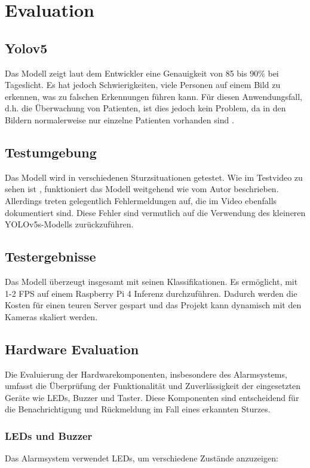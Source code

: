 \section{Evaluation}

\subsection{Yolov5}
Das Modell zeigt laut dem Entwickler eine Genauigkeit von 85 bis 90\% bei Tageslicht. Es hat jedoch Schwierigkeiten, viele Personen auf einem Bild zu erkennen, was zu falschen Erkennungen führen kann. Für diesen Anwendungsfall, d.h. die Überwachung von Patienten, ist dies jedoch kein Problem, da in den Bildern normalerweise nur einzelne Patienten vorhanden sind \cite{kumar_uttej2001image-based-human-fall-detection_2024}. 

\subsection{Testumgebung}
Das Modell wird in verschiedenen Sturzsituationen getestet. Wie im Testvideo zu sehen ist \cite{yolovideo}, funktioniert das Modell weitgehend wie vom Autor beschrieben. Allerdings treten gelegentlich Fehlermeldungen auf, die im Video ebenfalls dokumentiert sind. Diese Fehler sind vermutlich auf die Verwendung des kleineren YOLOv5s-Modells zurückzuführen.

\subsection{Testergebnisse}
Das Modell überzeugt insgesamt mit seinen Klassifikationen. Es ermöglicht, mit 1-2 FPS auf einem Raspberry Pi 4 Inferenz durchzuführen. Dadurch werden die Kosten für einen teuren Server gespart und das Projekt kann dynamisch mit den Kameras skaliert werden.

\subsection{Hardware Evaluation}

Die Evaluierung der Hardwarekomponenten, insbesondere des Alarmsystems, umfasst die Überprüfung der Funktionalität und Zuverlässigkeit der eingesetzten Geräte wie LEDs, Buzzer und Taster. Diese Komponenten sind entscheidend für die Benachrichtigung und Rückmeldung im Fall eines erkannten Sturzes.

\subsubsection{LEDs und Buzzer}
Das Alarmsystem verwendet LEDs, um verschiedene Zustände anzuzeigen:

